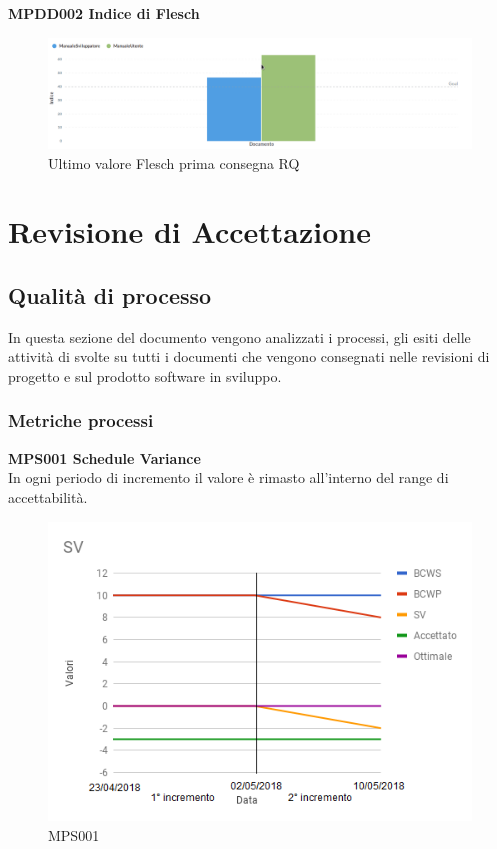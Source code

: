 \documentclass[PianoDiQualifica.tex]{subfiles}
\begin{document}
\textbf{MPDD002 Indice di Flesch}
\begin{figure}[H]
	\centering
	\includegraphics[width=1\linewidth]{RQ/flesch}
	\caption{Ultimo valore Flesch prima consegna RQ}
	\label{fig:processi}
\end{figure}

\section{Revisione di Accettazione}

\subsection{Qualità di processo}
In questa sezione del documento vengono analizzati i processi, gli esiti delle attività di  svolte su tutti i documenti che vengono consegnati nelle revisioni di progetto e sul prodotto software in sviluppo.

\subsubsection{Metriche processi}

\textbf{MPS001 Schedule Variance}\\
In ogni periodo di incremento il valore è rimasto all'interno del range di accettabilità.
\begin{figure}[H]
	\centering
	\includegraphics[width=0.7\linewidth]{RA/SV}
	\caption{MPS001}
	\label{fig:processi}
\end{figure}
\newpage
\end{document}
